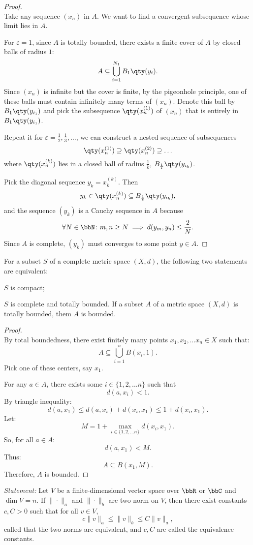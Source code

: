 \documentclass[a4paper,12pt]{article}
\begin{document}
\begin{proof}\mbox{}\\
Take any sequence $(x_n)$ in $A$. We want to find a convergent subsequence whose limit lies in $A$.

For $\varepsilon=1$, since $A$ is totally bounded, there exists a finite cover of $A$ by closed balls of radius $1$:
    \[A\subseteq\bigcup_{i=1}^{N_1}B_1\qty(y_i).\]
    Since $(x_n)$ is infinite but the cover is finite, by the pigeonhole principle, one of these balls must contain infinitely many terms of $(x_n)$. Denote this ball by $B_1\qty(y_{i_1})$ and pick the subsequence $\qty(x_n^{(1)})$ of $(x_n)$ that is entirely in $B_1\qty(y_{i_1})$.

    Repeat it for $\varepsilon=\frac{1}{2},\frac{1}{3},\ldots$, we can construct a nested sequence of subsequences
    \[\qty(x_n^{(1)})\supseteq \qty(x_n^{(2)})\supseteq\ldots\]
    where $\qty(x_n^{(k)})$ lies in a closed ball of radius $\frac{1}{k}$, $B_{\frac{1}{k}}\qty(y_{i_k})$.

    Pick the diagonal sequence $y_k=x_k^{(k)}$. Then
    \[y_k\in\qty(x_n^{(k)})\subseteq B_{\frac{1}{k}}\qty(y_{i_k}),\]
    and the sequence $(y_k)$ is a Cauchy sequence in $A$ because
    \[\forall N\in\bbN\colon m,n\geq N\implies d(y_m,y_n)\leq\frac{2}{N}.\]
    Since $A$ is complete, $(y_k)$ must converges to some point $y\in A$.
\end{proof}
For a subset $S$ of a complete metric space $(X,d)$, the following two statements are equivalent:
\bit
\item $S$ is compact;
\item $S$ is complete and totally bounded.
\eit
{}
 If a subset $A$ of a metric space $(X,d)$ is totally bounded, them $A$ is bounded.

\begin{proof}\mbox{}\\
By total boundedness, there exist finitely many points $x_1,x_2,\ldots x_n\in X$ such that:
\[A\subseteq\bigcup_{i=1}^nB(x_i,1).\]
Pick one of these centers, say $x_1$.

For any $a\in A$, there exists some $i\in\{1,2,\ldots n\}$ such that
\[d(a,x_i)<1.\]
By triangle inequality:
\[d(a,x_1)\leq d(a,x_i)+d(x_i,x_1)\leq 1+d(x_i,x_1).\]
Let:
\[M=1+\max_{i\in\{1,2,\ldots n\}}d(x_i,x_1).\]
So, for all $a\in A$:
\[d(a,x_1)<M.\]
Thus:
\[A\subseteq B(x_1,M).\]
Therefore, $A$ is bounded.
\end{proof}
\textit{Statement: }Let $V$ be a finite-dimensional vector space over $\bbR$ or $\bbC$ and $\dim V=n$. If $\|\cdot\|_a
$ and $\|\cdot\|_b$ are two norm on $V$, then there exist constants $c,C>0$ such that for all $v\in V$,
\[c\|v\|_a\leq\|v\|_b\leq C\|v\|_a,\]
called that the two norms are equivalent, and $c,C$ are called the equivalence constants.
\end{document}
